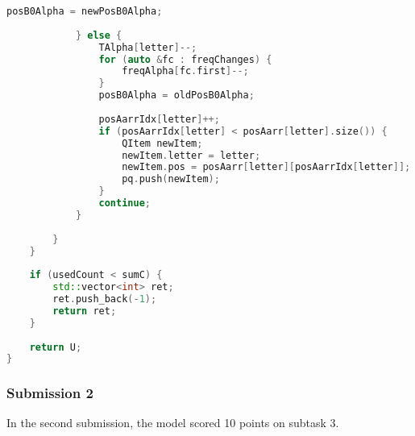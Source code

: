 \begin{lstlisting}[language=C++]
                posB0Alpha = newPosB0Alpha;
 
            } else {
                TAlpha[letter]--;
                for (auto &fc : freqChanges) {
                    freqAlpha[fc.first]--;
                }
                posB0Alpha = oldPosB0Alpha;
 
                posAarrIdx[letter]++;
                if (posAarrIdx[letter] < posAarr[letter].size()) {
                    QItem newItem;
                    newItem.letter = letter;
                    newItem.pos = posAarr[letter][posAarrIdx[letter]];
                    pq.push(newItem);
                }
                continue;
            }
 
        }
    }
 
    if (usedCount < sumC) {
        std::vector<int> ret;
        ret.push_back(-1);
        return ret;
    }
 
    return U;
}
\end{lstlisting}


\subsubsection{Submission 2}
In the second submission, the model scored 10 points on subtask 3.

